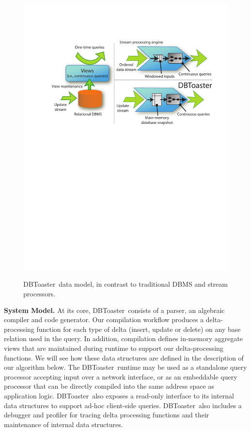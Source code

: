 \documentclass{vldb}
\newcommand{\compiler}{DBToaster}
\begin{document}
\begin{figure}[tb]
\includegraphics[scale=0.5]{figures/dbt-datamodel.pdf}
\label{fig:datamodel}
\caption{\compiler\ data model, in contrast to traditional DBMS and stream
processors.}
\end{figure}

\noindent\textbf{System Model.}
At its core, \compiler\ consists of a parser, an algebraic compiler and
code generator. Our compilation workflow produces a delta-processing function
for each type of delta (insert, update or delete) on any base relation used in
the query. In addition, compilation defines in-memory aggregate views that are
maintained during runtime to support our delta-processing functions. We will
see how these data structures are defined in the description of our algorithm
below. The \compiler\ runtime may be used as a standalone query processor
accepting input over a network interface, or as an embeddable query processor
that can be directly compiled into the same address space as application logic.
\compiler\ also exposes a read-only interface to its internal data structures to
support ad-hoc client-side queries. \compiler\ also includes a debugger and
profiler for tracing delta processing functions and their maintenance of
internal data structures.
\end{document}
